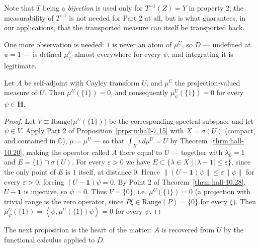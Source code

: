 Note that $T$ being a \textit{bijection} is used only for $T^{-1}(Z) = Y$ in property 2; the measurability of $T^{-1}$ is not needed for Part 2 at all, but is what guarantees, in our applications, that the transported measure can itself be transported back.

One more observation is needed: $1$ is never an atom of $\mu^U$, so $D$ — undefined at $u=1$ — is defined $\mu^U_\psi$-almost everywhere for every $\psi$, and integrating it is legitimate.

\begin{lemma}
    \label{lmm:cayley-omits-one}
    \leanok
    Let $A$ be self-adjoint with Cayley transform $U$, and $\mu^U$ the projection-valued measure of $U$. Then $\mu^U(\{1\}) = 0$, and consequently $\mu^U_\psi(\{1\}) = 0$ for every $\psi \in \mathbf{H}$.
\end{lemma}
\begin{proof}
    \leanok
Let $V \equiv \text{Range}\big(\mu^U(\{1\})\big)$ be the corresponding spectral subspace and let $\psi \in V$. Apply Part 2 of Proposition~\ref{prpstn:hall-7.15} with $X = \sigma(U)$ (compact, and contained in $\mathbb{C}$), $\mu = \mu^U$ — so that $\int_X \iota\,d\mu^U = U$ by Theorem~\ref{thrm:hall-10.20}, making the operator called $A$ there equal to $U$ — together with $\lambda_0 = 1$ and $E = \{1\} \cap \sigma(U)$. For every $\varepsilon > 0$ we have $E \subset \{ \lambda \in X \mid \lvert \lambda - 1 \rvert \le \varepsilon \}$, since the only point of $E$ is $1$ itself, at distance $0$. Hence $\left\| (U - \mathbf{1})\psi \right\| \le \varepsilon\left\| \psi \right\|$ for every $\varepsilon>0$, forcing $(U-\mathbf{1})\psi = 0$. By Point 2 of Theorem~\ref{thrm:hall-10.28}, $U - \mathbf{1}$ is injective, so $\psi = 0$. Thus $V = \{0\}$, i.e. $\mu^U(\{1\}) = 0$ (a projection with trivial range is the zero operator, since $P\xi \in \text{Range}(P) = \{0\}$ for every $\xi$). Then $\mu^U_\psi(\{1\}) = \left< \psi, \mu^U(\{1\})\psi \right> = 0$ for every $\psi$.
\end{proof}

The next proposition is the heart of the matter: $A$ is recovered from $U$ by the functional calculus applied to $D$.

